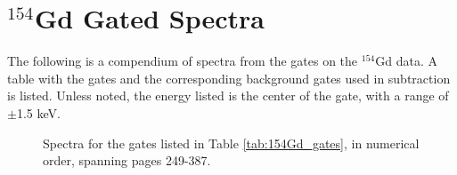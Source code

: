 
\chapter{$^{154}$Gd Gated Spectra}
\label{chap:154_spectra}

The following is a compendium of spectra from the gates on the $^{154}$Gd data. A table with the gates and the corresponding background gates used in subtraction is listed. Unless noted, the energy listed is the center of the gate, with a range of $\pm$1.5 keV.



\pagebreak

\begin{figure}
    \caption{Spectra for the gates listed in Table \ref{tab:154Gd_gates}, in numerical order, spanning pages 249-387.}
    \label{fig:154_App}
\end{figure}

\pagebreak

